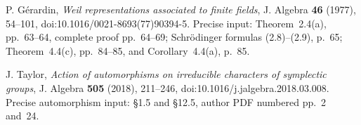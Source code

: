 P. G\'erardin, \emph{Weil representations associated to finite fields},
J. Algebra \textbf{46} (1977), 54--101,
doi:10.1016/0021-8693(77)90394-5.
Precise input: Theorem~2.4(a), pp.~63--64, complete proof
pp.~64--69; Schr\"odinger formulas (2.8)--(2.9), p.~65;
Theorem~4.4(c), pp.~84--85, and Corollary~4.4(a), p.~85.

J. Taylor, \emph{Action of automorphisms on irreducible characters
of symplectic groups}, J. Algebra \textbf{505} (2018), 211--246,
doi:10.1016/j.jalgebra.2018.03.008.
Precise automorphism input: \S1.5 and \S12.5,
author PDF numbered pp.~2 and~24.
